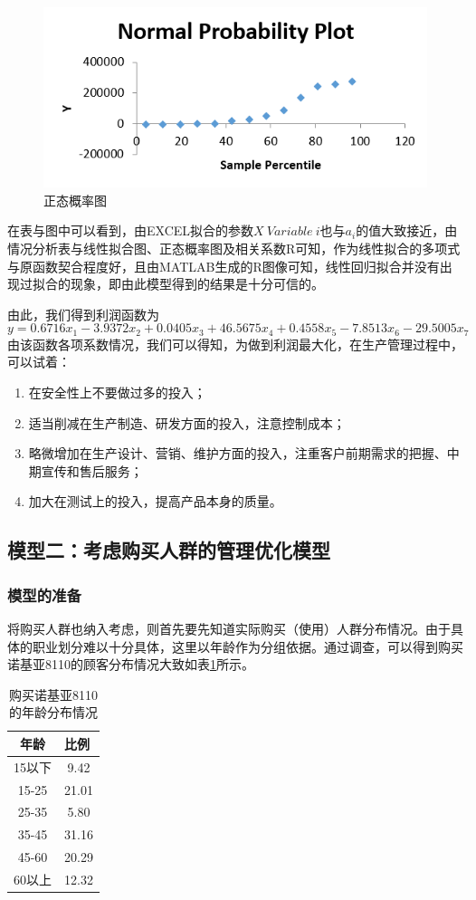 \documentclass[12pt]{article}%
\begin{document}
\begin{figure}[htbp]
  \centering
  \includegraphics[width=.7\textwidth]{TIM20180704210336.png} 
  \caption{正态概率图} 
  \label{TIM20180704210336.png} 
\end{figure}

在表与图中可以看到，由EXCEL拟合的参数$X\ Variable\ i$也与$a_i$的值大致接近，由情况分析表与线性拟合图、正态概率图及相关系数R可知，作为线性拟合的多项式与原函数契合程度好，且由MATLAB生成的R图像可知，线性回归拟合并没有出现过拟合的现象，即由此模型得到的结果是十分可信的。

由此，我们得到利润函数为
\begin{equation}
y=0.6716x_1-3.9372x_2+0.0405x_3+46.5675x_4+0.4558x_5-7.8513x_6-29.5005x_7
\end{equation}
由该函数各项系数情况，我们可以得知，为做到利润最大化，在生产管理过程中，可以试着：
\begin{enumerate}[1.]\addtolength{\itemsep}{-1.5ex}
\item 在安全性上不要做过多的投入；
\item 适当削减在生产制造、研发方面的投入，注意控制成本；
\item 略微增加在生产设计、营销、维护方面的投入，注重客户前期需求的把握、中期宣传和售后服务；
\item 加大在测试上的投入，提高产品本身的质量。
\end{enumerate}
\subsection{模型二：考虑购买人群的管理优化模型}
\subsubsection{模型的准备}
将购买人群也纳入考虑，则首先要先知道实际购买（使用）人群分布情况。由于具体的职业划分难以十分具体，这里以年龄作为分组依据。通过调查，可以得到购买诺基亚8110的顾客分布情况大致如表\ref{tab:addlabelren1}所示。
\begin{table}[htbp]
  \centering
  \caption{购买诺基亚8110的年龄分布情况}
    \begin{tabular}{cc}
    \hline
    年龄 & \multicolumn{1}{l}{比例} \\
    \hline
    15以下 & 9.42  \\
    15-25 & 21.01  \\
    25-35 & 5.80  \\
    35-45 & 31.16  \\
    45-60 & 20.29  \\
    60以上 & 12.32  \\
    \hline
    \end{tabular}%
  \label{tab:addlabelren1}%
\end{table}%
\end{document}
